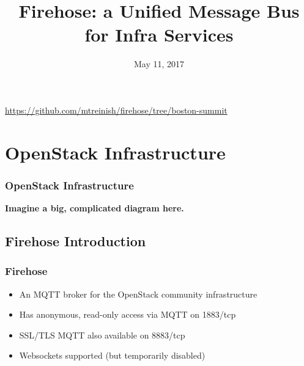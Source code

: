 \documentclass[aspectratio=169,11pt,hyperref={colorlinks=true}]{beamer}
\author[Matthew Treinish & Jeremy Stanley]{%
    \texorpdfstring{%
        \begin{columns}
            \column{.45\linewidth}
            \centering
            Matthew Treinish\\
            \href{mailto:mtreinish@kortar.org}{mtreinish@kortar.org}\\
        \texttt{mtreinish on Freenode}
        \column{.45\linewidth}
            \centering
            Jeremy Stanley\\
            \href{mailto:fungi@yuggoth.org}{fungi@yuggoth.org}\\
            \texttt{fungi on Freenode}
        \end{columns}
        }
    {Matthew Treinish & Jeremy Stanley}
}
\date{May 11, 2017}
\title[Firehose: a Unified Message Bus for Infra Services
\hspace{2em}\insertframenumber/\inserttotalframenumber]{Firehose: a Unified Message Bus for Infra Services}
\begin{document}
{%
\begin{frame}[noframenumbering]
    \hypersetup{colorlinks,urlcolor=white}
    \titlepage{}
    \centering
    \href{https://github.com/mtreinish/firehose/tree/boston-summit}{https://github.com/mtreinish/firehose/tree/boston-summit}
\end{frame}
}

\section{OpenStack Infrastructure}
\begin{frame}
\frametitle{OpenStack Infrastructure}
\centering
\textbf{Imagine a big, complicated diagram here.}
\end{frame}

\subsection{Firehose Introduction}
\begin{frame}
	\frametitle{Firehose}
    \begin{itemize}
        \item An MQTT broker for the OpenStack community infrastructure
        \item Has anonymous, read-only access via MQTT on 1883/tcp
        \item SSL/TLS MQTT also available on 8883/tcp
        \item Websockets supported (but temporarily disabled)
    \end{itemize}
\end{frame}
\end{document}
